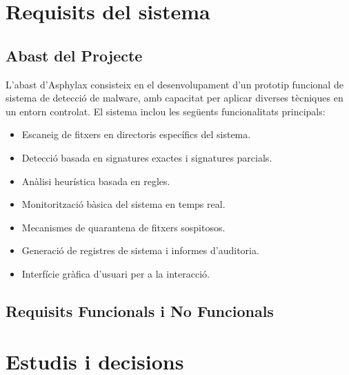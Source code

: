 \documentclass[12pt,a4paper]{report}
\begin{document}
\chapter{Requisits del sistema}
\label{ch:requisits}

\section{Abast del Projecte}
L'abast d'Asphylax consisteix en el desenvolupament d'un prototip funcional de sistema de detecció de malware, amb capacitat per aplicar diverses tècniques en un entorn controlat. El sistema inclou les següents funcionalitats principals:
\begin{itemize}
    \item Escaneig de fitxers en directoris específics del sistema.
    \item Detecció basada en signatures exactes i signatures parcials.
    \item Anàlisi heurística basada en regles.
    \item Monitorització bàsica del sistema en temps real.
    \item Mecanismes de quarantena de fitxers sospitosos.
    \item Generació de registres de sistema i informes d'auditoria.
    \item Interfície gràfica d'usuari per a la interacció.
\end{itemize}

\section{Requisits Funcionals i No Funcionals}


\chapter{Estudis i decisions}
\label{ch:estudisdecisions}
\end{document}
